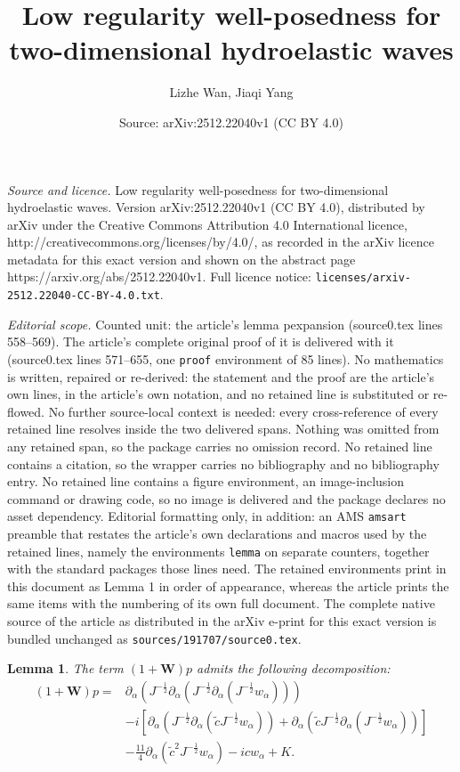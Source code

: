 \documentclass[10pt,a4paper]{amsart}
\title{Low regularity well-posedness for two-dimensional hydroelastic waves}
\author{Lizhe Wan, Jiaqi Yang}
\date{Source: arXiv:2512.22040v1 (CC BY 4.0)}
\newtheorem{lemma}{Lemma}
\newcommand{\al}{\alpha}
\newcommand{\f}{\frac}
\newcommand{\p}{\partial}
\begin{document}
\maketitle

\noindent\emph{Source and licence.} Low regularity well-posedness for two-dimensional hydroelastic waves. Version arXiv:2512.22040v1 (CC BY 4.0), distributed by arXiv under the Creative Commons Attribution 4.0 International licence, http://creativecommons.org/licenses/by/4.0/, as recorded in the arXiv licence metadata for this exact version and shown on the abstract page https://arxiv.org/abs/2512.22040v1. Full licence notice: \texttt{licenses/arxiv-2512.22040-CC-BY-4.0.txt}.\par\smallskip

\noindent\textit{Editorial scope.} Counted unit: the article's lemma pexpansion (source0.tex lines 558--569). The article's complete original proof of it is delivered with it (source0.tex lines 571--655, one \texttt{proof} environment of 85 lines). No mathematics is written, repaired or re-derived: the statement and the proof are the article's own lines, in the article's own notation, and no retained line is substituted or re-flowed.  No further source-local context is needed: every cross-reference of every retained line resolves inside the two delivered spans.  Nothing was omitted from any retained span, so the package carries no omission record.  No retained line contains a citation, so the wrapper carries no bibliography and no bibliography entry.  No retained line contains a figure environment, an image-inclusion command or drawing code, so no image is delivered and the package declares no asset dependency.  Editorial formatting only, in addition: an AMS \texttt{amsart} preamble that restates the article's own declarations and macros used by the retained lines, namely the environments \texttt{lemma} on separate counters, together with the standard packages those lines need.  The retained environments print in this document as Lemma 1 in order of appearance, whereas the article prints the same items with the numbering of its own full document.  The complete native source of the article as distributed in the arXiv e-print for this exact version is bundled unchanged as \texttt{sources/191707/source0.tex}.
\begin{lemma}
The term $(1+\mathbf{W})p$ admits the following decomposition:
\begin{equation} \label{pexpansion}
\begin{split}
(1+\mathbf{W})p=&\p_{\al}(J^{-\f12}\p_{\al}(J^{-\f12}\p_{\al}(J^{-\f12}w_{\al})))\\
&-i\left[\p_{\al}\left(J^{-\f12}\p_{\al}\left(\tilde{c}J^{-\f12}w_{\al}\right)\right)
+\p_{\al}\left(\tilde{c}J^{-\f12}\p_{\al}\left(J^{-\f12}w_{\al}\right)\right)\right]\\
&-\f{11}4\p_{\al}\left(\tilde{c}^2J^{-\f12}w_{\al}\right)
-icw_{\al} + K.
\end{split}    
\end{equation}
\end{lemma}
\end{document}
